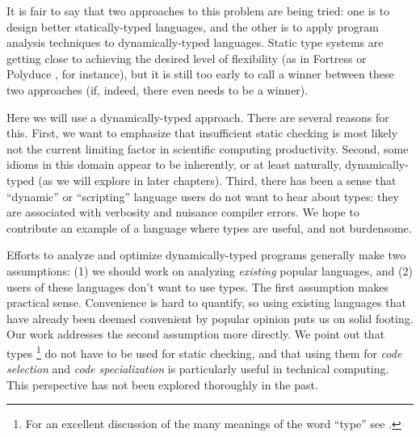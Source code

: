 It is fair to say that two approaches to this problem are being tried: one is
to design better statically-typed languages, and the other is to apply
program analysis techniques to dynamically-typed languages.
Static type systems are getting close to achieving the desired level
of flexibility (as in Fortress \cite{fortresspec} or Polyduce \cite{polyduce1},
for instance), but it is still too early to call a winner between these two
approaches (if, indeed, there even needs to be a winner).

Here we will use a dynamically-typed approach. There are several
reasons for this. First, we want to emphasize that insufficient static
checking is most likely not the current limiting factor in scientific
computing productivity. Second, some idioms in this domain appear to be
inherently, or at least naturally, dynamically-typed (as we will explore in
later chapters). Third, there has been a sense that ``dynamic'' or
``scripting'' language users do not want to hear about types: they are
associated with verbosity and nuisance compiler errors. We hope to
contribute an example of a language where types are useful, and not
burdensome.


Efforts to analyze and optimize dynamically-typed programs generally make two
assumptions: (1) we should work on analyzing \emph{existing} popular
languages, and (2) users of these languages don't want to use types.
The first assumption makes practical sense.
Convenience is hard to quantify, so using existing languages that have already
been deemed convenient by popular opinion puts us on solid footing.
Our work addresses the second assumption more directly.
We point out that types
\footnote{For an excellent discussion of the many meanings of the word ``type''
see \cite{Kell2014}.}
do not have to be used for static checking, and that using them for
\emph{code selection} and \emph{code specialization} is particularly useful in
technical computing.
This perspective has not been explored thoroughly in the past.


